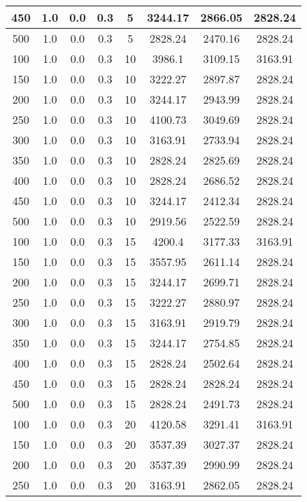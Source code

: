 \documentclass[a4paper, 12pt]{extreport}
\begin{document}
\begin{itemize}
\begin{longtable}{|c|c|c|c|c|c|c|c|}
			450 & 1.0 & 0.0 & 0.3 & 5 & 3244.17 & 2866.05 & 2828.24 \\\hline
			500 & 1.0 & 0.0 & 0.3 & 5 & 2828.24 & 2470.16 & 2828.24 \\\hline
			100 & 1.0 & 0.0 & 0.3 & 10 & 3986.1 & 3109.15 & 3163.91 \\\hline
			150 & 1.0 & 0.0 & 0.3 & 10 & 3222.27 & 2897.87 & 2828.24 \\\hline
			200 & 1.0 & 0.0 & 0.3 & 10 & 3244.17 & 2943.99 & 2828.24 \\\hline
			250 & 1.0 & 0.0 & 0.3 & 10 & 4100.73 & 3049.69 & 2828.24 \\\hline
			300 & 1.0 & 0.0 & 0.3 & 10 & 3163.91 & 2733.94 & 2828.24 \\\hline
			350 & 1.0 & 0.0 & 0.3 & 10 & 2828.24 & 2825.69 & 2828.24 \\\hline
			400 & 1.0 & 0.0 & 0.3 & 10 & 2828.24 & 2686.52 & 2828.24 \\\hline
			450 & 1.0 & 0.0 & 0.3 & 10 & 3244.17 & 2412.34 & 2828.24 \\\hline
			500 & 1.0 & 0.0 & 0.3 & 10 & 2919.56 & 2522.59 & 2828.24 \\\hline
			100 & 1.0 & 0.0 & 0.3 & 15 & 4200.4 & 3177.33 & 3163.91 \\\hline
			150 & 1.0 & 0.0 & 0.3 & 15 & 3557.95 & 2611.14 & 2828.24 \\\hline
			200 & 1.0 & 0.0 & 0.3 & 15 & 3244.17 & 2699.71 & 2828.24 \\\hline
			250 & 1.0 & 0.0 & 0.3 & 15 & 3222.27 & 2880.97 & 2828.24 \\\hline
			300 & 1.0 & 0.0 & 0.3 & 15 & 3163.91 & 2919.79 & 2828.24 \\\hline
			350 & 1.0 & 0.0 & 0.3 & 15 & 3244.17 & 2754.85 & 2828.24 \\\hline
			400 & 1.0 & 0.0 & 0.3 & 15 & 2828.24 & 2502.64 & 2828.24 \\\hline
			450 & 1.0 & 0.0 & 0.3 & 15 & 2828.24 & 2828.24 & 2828.24 \\\hline
			500 & 1.0 & 0.0 & 0.3 & 15 & 2828.24 & 2491.73 & 2828.24 \\\hline
			100 & 1.0 & 0.0 & 0.3 & 20 & 4120.58 & 3291.41 & 3163.91 \\\hline
			150 & 1.0 & 0.0 & 0.3 & 20 & 3537.39 & 3027.37 & 2828.24 \\\hline
			200 & 1.0 & 0.0 & 0.3 & 20 & 3537.39 & 2990.99 & 2828.24 \\\hline
			250 & 1.0 & 0.0 & 0.3 & 20 & 3163.91 & 2862.05 & 2828.24 \\\hline

\end{longtable}
\end{itemize}
\end{document}
